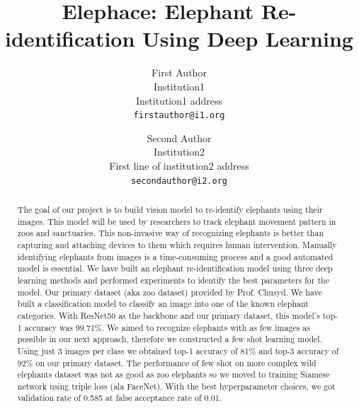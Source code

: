 \documentclass[10pt,twocolumn,letterpaper]{article}
\begin{document}
\title{Elephace: Elephant Re-identification Using Deep Learning}

\author{First Author\\
Institution1\\
Institution1 address\\
{\tt\small firstauthor@i1.org}
\and
Second Author\\
Institution2\\
First line of institution2 address\\
{\tt\small secondauthor@i2.org}
}
\maketitle

\begin{abstract}

The goal of our project is to build vision model to re-identify elephants using their images. This model will be used by researchers to track elephant movement pattern in zoos and sanctuaries. 
This non-invasive way of recognizing elephants is better than capturing and attaching devices to them which requires human intervention. Manually identifying elephants from images is a time-consuming process and a good automated model is essential. We have built an elephant re-identification model using three deep learning methods and performed experiments to identify the best parameters for the model. Our primary dataset (aka zoo dataset) provided by Prof. Chusyd. We have built a classification model to classify an image into one of the known elephant categories. With ResNet50 as the backbone and our primary dataset, this model's top-1 accuracy was 99.71\%. We aimed to recognize elephants with as few images as possible in our next approach, therefore we constructed a few shot learning model. Using just 3 images per class we obtained top-1 accuracy of 81\% and top-3 accuracy of 92\% on our primary dataset. The performance of few shot on more complex wild elephants dataset was not as good as zoo elephants so we moved to training Siamese network using triple loss (ala FaceNet). With the best hyperparameter choices, we got validation rate of 0.585 at false acceptance rate of 0.01.



\end{abstract}
\end{document}
